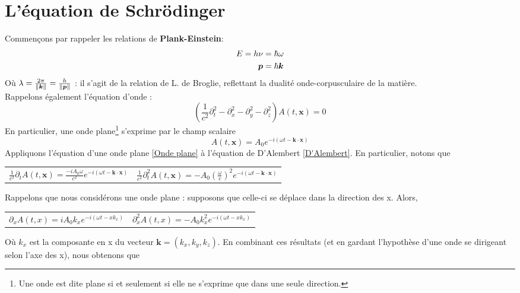 \documentclass[../notesdecours]{subfiles}
\begin{document}
\part{L'équation de Schrödinger}
Commençons par rappeler les relations de \textbf{Plank-Einstein}:
\begin{align}
E = h \nu &= \hbar \omega\\
\bm{p} &= \hbar \bm{k}
\end{align}
Où $\lambda = \frac{2\pi}{\norm{\bm{k}}} = \frac{h}{\norm{\bm{p}}}$ : il s'agit de la relation de L. de Broglie, reflettant la dualité onde-corpusculaire de la matière.\\

Rappelons également l'équation d'onde :
\begin{equation}
\label{D'Alembert}
\left( \frac{1}{c^2} \partial_t^2 - \partial_x^2 - \partial_y^2 - \partial_z^2 \right)A(t,\bm{x}) = 0
\end{equation}
En particulier, une onde plane\footnote{Une onde est dite plane si et seulement si elle ne s'exprime que dans une seule direction.} s'exprime par le champ scalaire 
\begin{equation}
\label{Onde plane}
A(t,\bm{x}) = A_0 e^{-i \left( \omega t - \bm{k} \cdot \bm{x} \right) }
\end{equation}
Appliquons l'équation d'une onde plane \ref{Onde plane} à l'équation de D'Alembert \ref{D'Alembert}. En particulier, notons que
\begin{center}
\begin{tabular}{c c}
$\frac{1}{c^2} \partial_t A(t,\bm{x}) = \frac{-iA_0 \omega}{c^2} e^{-i \left( \omega t - \bm{k} \cdot \bm{x} \right)}$ & $\frac{1}{c^2} \partial_t^2 A(t,\bm{x}) = - A_0 \left( \frac{\omega}{c}\right)^2 e^{-i \left( \omega t - \bm{k} \cdot \bm{x} \right)}$\\
\end{tabular}
\end{center}
Rappelons que nous considérons une onde plane : supposons que celle-ci se déplace dans la direction des x. Alors,
\begin{center}
\begin{tabular}{c c}
$\partial_x A(t,x) = iA_0k_x e^{-i \left( \omega t - xk_x \right)}$ & $\partial_x^2 A(t,x) = -A_0k_x^2 e^{-i \left( \omega t - xk_x \right)}$
\end{tabular}
\end{center}
Où $k_x$ est la composante en x du vecteur $\bm{k} = \left( k_x,k_y,k_z \right)$. En combinant ces résultats (et en gardant l'hypothèse d'une onde se dirigeant selon l'axe des x), nous obtenons que
\end{document}
